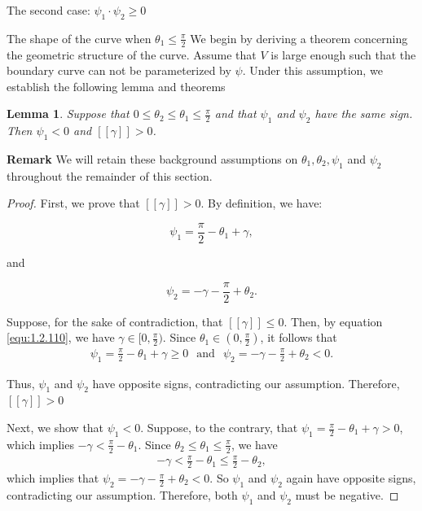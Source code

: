 \documentclass[letterpaper,reqno,10pt,twoside]{amsart}
\newtheorem{lemma}[theorem]{Lemma}
\theoremstyle{definition}
\theoremstyle{remark}
\begin{document}
\begin{section}{The second case: $\psi_1\cdot \psi_2\geq 0$ }
\begin{subsection}{The shape of the curve when $\theta_1\leq \frac{\pi}{2}$}
    We begin by deriving a theorem concerning the geometric structure of the curve. Assume that $V$ is large enough such that the boundary curve can not be parameterized by $\psi$. Under this assumption,  we establish the following lemma and theorems

    \begin{lemma}

    Suppose that $0\leq \theta_2\leq \theta_1\leq \frac{\pi}{2}$ and that $\psi_1$ and $\psi_2$ have the same sign. Then $\psi_1<0$ and $[\![\gamma]\!]>0$.  
    \end{lemma}

    \textbf{Remark} We will retain these background assumptions on
$\theta_1,\theta_{2},\psi_{1}$ and $\psi_{2}$ throughout the remainder of this section.
    
    \begin{proof}

        First, we prove that $[\![\gamma]\!]>0$.  By definition, we have:

        \begin{equation*}
            \psi_1=\frac{\pi}{2}-\theta_1+\gamma,
        \end{equation*}

        \noindent and
        
        \begin{equation*}
            \psi_2=-\gamma-\frac{\pi}{2}+\theta_2.
        \end{equation*}

        \noindent Suppose, for the sake of contradiction, that $[\![\gamma]\!]\leq 0$. Then, by equation \eqref{equ:1.2.110}, we have $\gamma\in[0,\frac{\pi}{2})$. Since $\theta_1\in(0,\frac{\pi}{2})$, it follows that 
        \begin{align}
            \psi_1=\frac{\pi}{2}-\theta_1+\gamma\geq 0~~\operatorname{and}~~\psi_2=-\gamma-\frac{\pi}{2}+\theta_2<0.
        \end{align}
        
        \noindent Thus, $\psi_1$ and $\psi_2$ have opposite signs, contradicting our assumption. Therefore, $[\![\gamma]\!]>0$
        
        Next, we show that $\psi_{1}<0$. Suppose, to the contrary, that  $\psi_1=\frac{\pi}{2}-\theta_1+\gamma>0$, which implies $-\gamma<\frac{\pi}{2}-\theta_1$. Since $\theta_2\leq \theta_1\leq \frac{\pi}{2}$, we have 
        \begin{align}
            -\gamma<\frac{\pi}{2}-\theta_1\leq \frac{\pi}{2}-\theta_2,
        \end{align}
        which implies that  $\psi_2=-\gamma-\frac{\pi}{2}+\theta_2<0$. So $\psi_1$ and $\psi_2$ again have opposite signs, contradicting our assumption. Therefore, both $\psi_{1}$ and $\psi_{2}$ must be negative.
    \end{proof}


\end{subsection}
\end{section}
\end{document}
